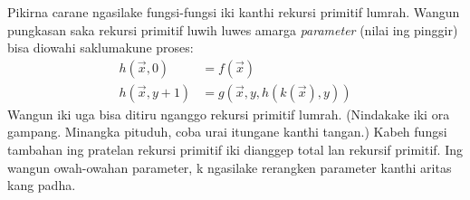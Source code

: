 \documentclass[../../../include/open-logic-section]{subfiles}
\begin{document}
Pikirna carane ngasilake fungsi-fungsi iki kanthi
rekursi primitif lumrah. Wangun pungkasan saka
rekursi primitif luwih luwes amarga
\emph{parameter} (nilai ing pinggir) bisa
diowahi saklumakune proses:
\begin{align*}
h(\vec x, 0) & = f(\vec x) \\
h(\vec x, y+1) & = g(\vec x, y, h(k(\vec x), y))
\end{align*}
Wangun iki uga bisa ditiru nganggo rekursi
primitif lumrah. (Nindakake iki ora gampang.
Minangka pituduh, coba urai itungane kanthi
tangan.) Kabeh fungsi tambahan ing pratelan rekursi primitif iki dianggep total lan rekursif primitif. Ing wangun owah-owahan parameter, k ngasilake rerangken parameter kanthi aritas kang padha.
\end{document}
